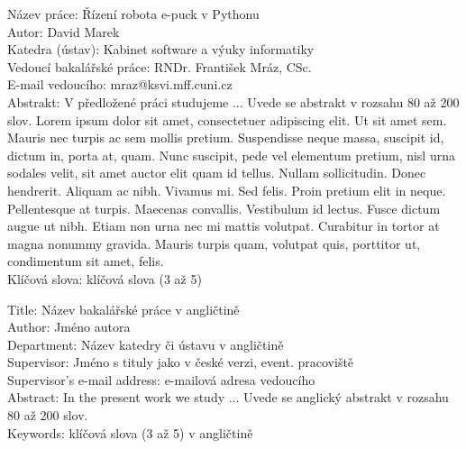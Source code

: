 \documentclass[12pt,notitlepage]{report}
\begin{document}

\tableofcontents %

\newpage %

\noindent
Název práce: Řízení robota e-puck v Pythonu\\
Autor: David Marek\\
Katedra (ústav): Kabinet software a výuky informatiky\\
Vedoucí bakalářské práce: RNDr. František Mráz, CSc.\\
E-mail vedoucího: mraz@ksvi.mff.cuni.cz\\

\noindent Abstrakt:  V předložené práci studujeme ... Uvede se abstrakt v rozsahu 80 až 200 slov. Lorem ipsum dolor sit amet, consectetuer adipiscing elit. Ut sit amet sem. Mauris nec turpis ac sem mollis pretium. Suspendisse neque massa, suscipit id, dictum in, porta at, quam. Nunc suscipit, pede vel elementum pretium, nisl urna sodales velit, sit amet auctor elit quam id tellus. Nullam sollicitudin. Donec hendrerit. Aliquam ac nibh. Vivamus mi. Sed felis. Proin pretium elit in neque. Pellentesque at turpis. Maecenas convallis. Vestibulum id lectus. Fusce dictum augue ut nibh. Etiam non urna nec mi mattis volutpat. Curabitur in tortor at magna nonummy gravida. Mauris turpis quam, volutpat quis, porttitor ut, condimentum sit amet, felis.\\

\noindent Klíčová slova: klíčová slova (3 až 5)

\vspace{10mm}

\noindent
Title: Název bakalářské práce v angličtině\\
Author: Jméno autora\\
Department: Název katedry či ústavu v angličtině\\
Supervisor: Jméno s tituly jako v české verzi, event. pracoviště\\
Supervisor's e-mail address: e-mailová adresa vedoucího\\

\noindent Abstract: In the present work we study ... Uvede se anglický abstrakt v rozsahu 80 až 200 slov. \\

\noindent Keywords: klíčová slova (3 až 5) v angličtině
\end{document}
